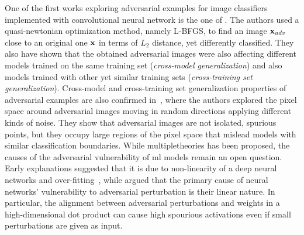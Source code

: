 One of the first works exploring adversarial examples for image classifiers implemented with convolutional neural network is the one of \citet{szegedy2013intriguing}.
The authors used a quasi-newtonian optimization method, namely L-BFGS, to find an image $\mathbf{x}_{adv}$ close to an original one $\mathbf{x}$ in terms of $L_2$ distance, yet differently classified.
They also have shown that the obtained adversarial images were also affecting different models trained on the same training set (\emph{cross-model generalization}) and also models trained with other yet similar training sets (\emph{cross-training set generalization}).
Cross-model and cross-training set generalization properties of adversarial examples are also confirmed in~\cite{tabacof2016exploring}, where the authors explored the pixel space around adversarial images moving in random directions applying different kinds of noise.
They show that adversarial images are not isolated, spurious points, but they occupy large regions of the pixel space that mislead models with similar classification boundaries.
While multipletheories has been proposed, the causes of the adversarial vulnerability of \gls{ml} models remain an open question.
Early explanations suggested that it is due to non-linearity of a deep neural networks and over-fitting~\cite{tabacof2016exploring}, while \citet{goodfellow2014explaining} argued that the primary cause of neural networks' vulnerability to adversarial perturbation is their linear nature.
In particular, the alignment between adversarial perturbations and weights in a high-dimensional dot product can cause high spourious activations even if small perturbations are given as input.

